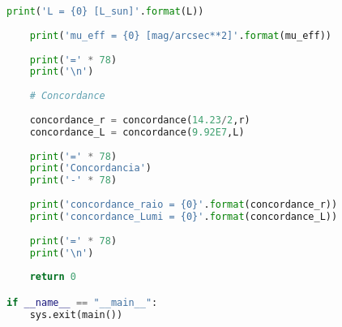 \documentclass[a4paper, 11pt, fleqn, leqno]{article}
\begin{document}
{\begin{lstlisting}[language=Python]
    print('L = {0} [L_sun]'.format(L))
    
    print('mu_eff = {0} [mag/arcsec**2]'.format(mu_eff))
    
    print('=' * 78)
    print('\n')
    
    # Concordance
    
    concordance_r = concordance(14.23/2,r)
    concordance_L = concordance(9.92E7,L)
    
    print('=' * 78)
    print('Concordancia')
    print('-' * 78)
    
    print('concordance_raio = {0}'.format(concordance_r))
    print('concordance_Lumi = {0}'.format(concordance_L))
    
    print('=' * 78)
    print('\n')
    
    return 0

if __name__ == "__main__":
    sys.exit(main())

\end{lstlisting}
}
\end{document}
